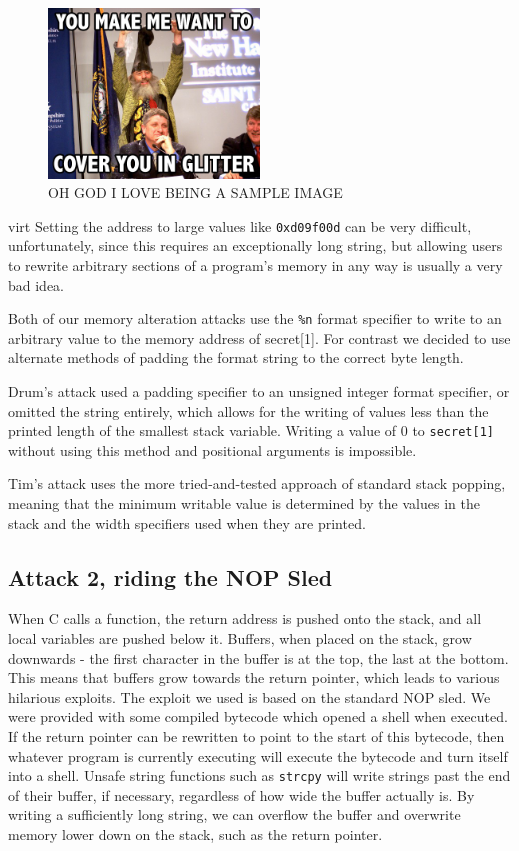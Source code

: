 \begin{figure}[ht]     
	\centering     
	\includegraphics[width = 0.5\textwidth]{./images/placeholder.jpg}     
	\caption{OH GOD I LOVE BEING A SAMPLE IMAGE}     
	\label{fig_vul_prog_stack}
\end{figure}
 virt
Setting the address to large values like {\tt 0xd09f00d} can be very difficult, unfortunately, since this requires an
exceptionally long string, but allowing users to rewrite arbitrary sections of a program's memory in any way is usually
a very bad idea.

Both of our memory alteration attacks use the {\tt \%n} format specifier to write to an arbitrary value to the memory
address of secret[1]. For contrast we decided to use alternate methods of padding the format string to the correct byte
length.

Drum's attack used a padding specifier to an unsigned integer format specifier, or omitted the string entirely,
which allows for the writing of values less than the printed length of the smallest stack variable. Writing a value of
0 to {\tt secret[1]} without using this method and positional arguments is impossible. 

Tim's attack uses the more tried-and-tested approach of standard stack popping, meaning that the minimum writable value
is determined by the values in the stack and the width specifiers used when they are printed.

\subsection{Attack 2, riding the NOP Sled}

When C calls a function, the return address is pushed onto the stack, and all local variables are pushed below it.
Buffers, when placed on the stack, grow downwards - the first character in the buffer is at the top, the last at the
bottom. This means that buffers grow towards the return pointer, which leads to various hilarious exploits. The exploit
we used is based on the standard NOP sled. We were provided with some compiled bytecode which opened a shell when
executed. If the return pointer can be rewritten to point to the start of this bytecode, then whatever program is
currently executing will execute the bytecode and turn itself into a shell. Unsafe string functions such as {\tt strcpy}
will write strings past the end of their buffer, if necessary, regardless of how wide the buffer actually is. By writing
a sufficiently long string, we can overflow the buffer and overwrite memory lower down on the stack, such as the return
pointer.

